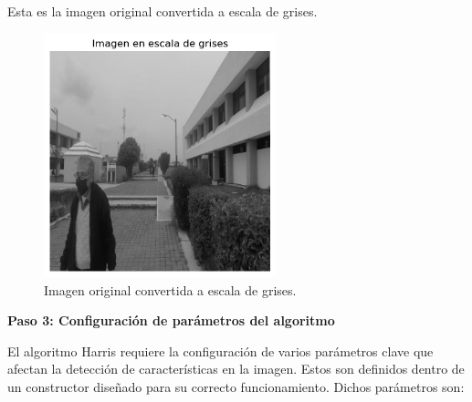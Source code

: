 \documentclass[a4paper]{article}
\begin{document}
Esta es la imagen original convertida a escala de grises.

\begin{figure}[H]
    \centering
    \includegraphics[width=0.6\textwidth]{images/harris_paso_2.png}
    \caption{Imagen original convertida a escala de grises.}
\end{figure}

\par\vspace{0.5cm}
\textbf{Paso 3: Configuración de parámetros del algoritmo}
\par\vspace{0.5cm}

El algoritmo Harris requiere la configuración de varios parámetros clave que afectan la detección de características en la imagen. Estos
son definidos dentro de un constructor diseñado para su correcto funcionamiento. Dichos parámetros son:
\end{document}
